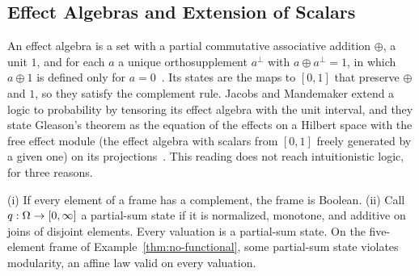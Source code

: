 \subsection{Effect Algebras and Extension of Scalars}
\label{sec:cat-effect}

An effect algebra is a set with a partial commutative associative
addition $\oplus$, a unit $1$, and for each $a$ a unique orthosupplement
$a^{\perp}$ with $a \oplus a^{\perp} = 1$, in which $a \oplus 1$ is
defined only for $a = 0$~\cite{foulis-bennett1994}. Its
states are the maps to $[0,1]$ that preserve $\oplus$ and $1$, so they
satisfy the complement rule. Jacobs and Mandemaker extend a logic to
probability by tensoring its effect algebra with the unit interval, and
they state Gleason's theorem as the equation of the effects on a Hilbert
space with the free effect module (the effect algebra with scalars from
$[0,1]$ freely generated by a given one) on its
projections~\cite{jacobs-mandemaker2012,jacobs2015}. This reading does not reach intuitionistic logic,
for three reasons.

\begin{theorem}
\label{thm:cat-effect}
(i) If every element of a frame has a complement, the frame is Boolean.
(ii) Call $q : \Omega \to [0,\infty]$ a partial-sum state if it is
normalized, monotone, and additive on joins of disjoint elements. Every
valuation is a partial-sum state. On the five-element frame of
Example~\ref{thm:no-functional}, some partial-sum state violates
modularity, an affine law valid on every valuation.
\end{theorem}

